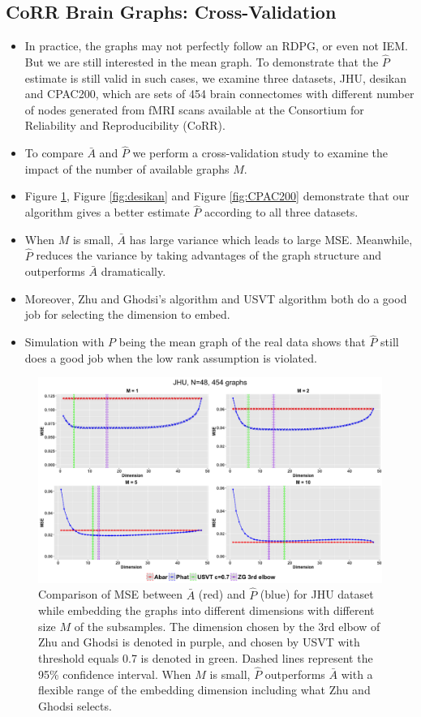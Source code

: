\documentclass[a4paper]{article}
\begin{document}
\subsection{CoRR Brain Graphs: Cross-Validation}
\begin{itemize}
\item In practice, the graphs may not perfectly follow an RDPG, or even not IEM. But we are still interested in the mean graph. To demonstrate that the $\hat{P}$ estimate is still valid in such cases, we examine three datasets, JHU, desikan and CPAC200, which are sets of 454 brain connectomes with different number of nodes generated from fMRI scans available at the Consortium for Reliability and Reproducibility (CoRR).
\item To compare $\bar{A}$ and $\hat{P}$ we perform a cross-validation study to examine the impact of the number of available graphs $M$.
\item Figure \ref{fig:JHU}, Figure \ref{fig:desikan} and Figure \ref{fig:CPAC200} demonstrate that our algorithm gives a better estimate $\hat{P}$ according to all three datasets. 
\item When $M$ is small, $\bar{A}$ has large variance which leads to large MSE. Meanwhile, $\hat{P}$ reduces the variance by taking advantages of the graph structure and outperforms $\bar{A}$ dramatically.
\item Moreover, Zhu and Ghodsi's algorithm and USVT algorithm both do a good job for selecting the dimension to embed.
\item Simulation with $P$ being the mean graph of the real data shows that $\hat{P}$ still does a good job when the low rank assumption is violated.
\end{itemize}

\begin{figure}[!htb]
\centering
\includegraphics[width=14cm]{JHU.png}
\caption{Comparison of MSE between $\bar{A}$ (red) and $\hat{P}$ (blue) for JHU dataset while embedding the graphs into different dimensions with different size $M$ of the subsamples. The dimension chosen by the 3rd elbow of Zhu and Ghodsi is denoted in purple, and chosen by USVT with threshold equals 0.7 is denoted in green. Dashed lines represent the 95\% confidence interval. When $M$ is small, $\hat{P}$ outperforms $\bar{A}$ with a flexible range of the embedding dimension including what Zhu and Ghodsi selects.}
\label{fig:JHU}
\end{figure}
\end{document}
